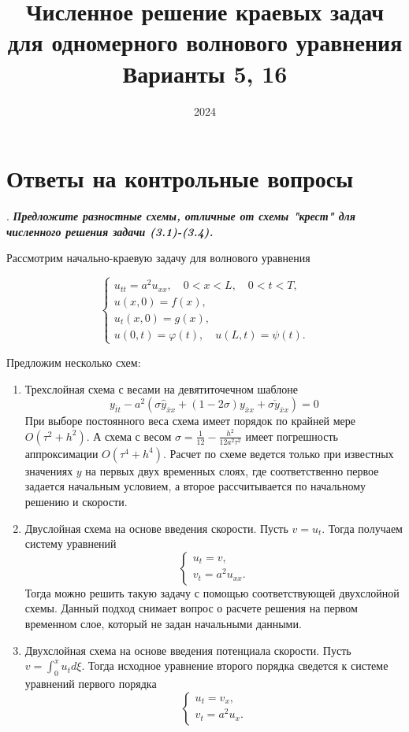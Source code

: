 \documentclass[12pt, a4paper]{article}
\title{Численное решение краевых задач
	для одномерного волнового уравнения \\ Варианты 5, 16}
\date{2024}
\renewcommand{\phi}{\varphi}
\newcommand{\widecheck}[1]{\check{#1}}
\newcounter{mycounter}
\newcommand{\quastion}[1]{%
	\stepcounter{mycounter}%
	\textbf{\themycounter}.  %
	\textbf{\textit{#1}}
	
}
\begin{document}
	\maketitle
	\section{Ответы на контрольные вопросы}
	
	\quastion{Предложите разностные схемы, отличные от схемы "крест" для численного решения задачи (3.1)-(3.4).}
	
	Рассмотрим начально-краевую задачу для волнового уравнения
	
	\begin{equation}
		\begin{cases}
			u_{tt} = a^2 u_{xx}, \quad 0<x<L, \quad 0<t<T, \\
			u(x, 0) = f(x), \\
			u_t(x, 0) = g(x), \\
			u(0,t)=\phi(t), \quad u(L,t) = \psi(t).
		\end{cases}
	\end{equation}
	
	Предложим несколько схем:
	\begin{enumerate}
		\item Трехслойная схема с весами на девятиточечном шаблоне 
		\begin{equation*}
				y_{\bar{t}t} - a^2 (\sigma \hat{y}_{\bar{x}x} + (1 - 2 \sigma) y_{\bar{x}x} + \sigma \widecheck{y}_{\bar{x}x}) = 0
		\end{equation*}
		При выборе постоянного веса схема имеет порядок по крайней мере $O(\tau^2 + h^2)$. А схема с весом $\sigma = \frac{1}{12} - \frac{h^2}{12a^2\tau^2}$ имеет погрешность аппроксимации $O(\tau^4 + h^4)$. Расчет по схеме ведется только при известных значениях $y$ на первых двух временных слоях, где соответственно первое задается начальным условием, а второе рассчитывается по начальному решению и скорости.
		
		\item Двуслойная схема на основе введения скорости. Пусть $v = u_t$. Тогда получаем систему уравнений
		\begin{equation}
			\begin{cases}
				u_t = v,\\
				v_t = a^2 u_{xx}.
			\end{cases}
		\end{equation}
		Тогда можно решить такую задачу с помощью соответствующей двухслойной схемы. Данный подход снимает вопрос о расчете решения на первом временном слое, который не задан начальными данными.
		
		\item Двухслойная схема на основе введения потенциала скорости. Пусть $v = \int_{0}^{x} u_t d\xi$. Тогда исходное уравнение второго порядка сведется к системе уравнений первого порядка
		\begin{equation}
			\begin{cases}
				u_t = v_x,\\
				v_t = a^2 u_x.
			\end{cases}
		\end{equation}
	\end{enumerate}
			
\end{document}
